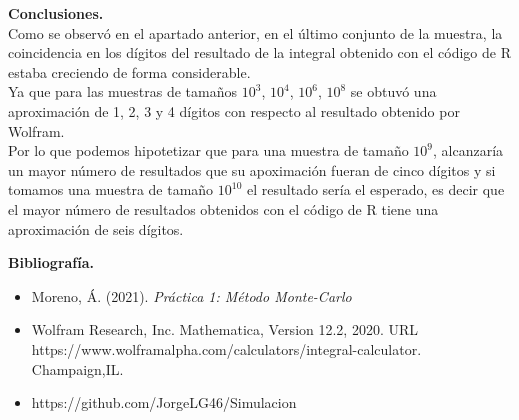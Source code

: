 \documentclass{report}
\begin{document}
\newpage

\noindent \Large \textbf{Conclusiones.} \\

\noindent Como se observó en el apartado anterior, en el último conjunto de la muestra, la coincidencia en los dígitos del resultado de la integral obtenido con el código de R estaba creciendo de forma considerable.  \\

\noindent Ya que para las muestras de tamaños $10^{3}$, $10^{4}$, $10^{6}$, $10^{8}$ se obtuvó una aproximación de 1, 2, 3 y 4 dígitos con respecto al resultado obtenido por Wolfram.\\

\noindent Por lo que podemos hipotetizar que para una muestra de tamaño $10^{9}$, alcanzaría un mayor número de resultados que su apoximación fueran de cinco dígitos y si tomamos una muestra de tamaño $10^{10}$ el resultado sería el esperado, es decir que el mayor número de resultados obtenidos con el código de R tiene una aproximación de seis dígitos.


\newpage

\noindent \Large \textbf{Bibliografía.} \\

\begin{itemize}
    \item Moreno, Á. (2021). \textit{Práctica 1: Método Monte-Carlo}
    
    \item Wolfram Research, Inc. Mathematica, Version 12.2, 2020. URL https://www.wolframalpha.com/calculators/integral-calculator. Champaign,IL.
    
    \item https://github.com/JorgeLG46/Simulacion
\end{itemize}
\end{document}
